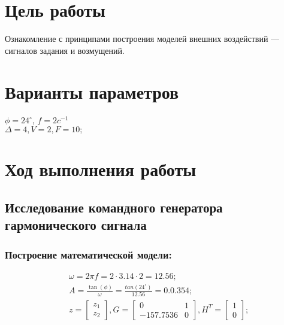 







\section{Цель работы}
Ознакомление с принципами построения моделей внешних воздействий — сигналов задания и возмущений.


\section{Варианты параметров}
$\phi = 24^\circ$, $f = 2 c^{-1}$\\
		
$\Delta=	4, V=2, F=10;$\\									
\section{Ход выполнения работы}

\subsection{Исследование командного генератора гармонического сигнала}

\subsubsection{Построение математической модели:}
\begin{equation}
	\begin{split}
&\omega=2\pi f=2\cdot 3.14\cdot 2=12.56;\\
&A=\frac{\tan(\phi)}{\omega}=\frac{tan(24^\circ)}{12.56}=0.0.354;\\
&z = \begin{bmatrix}
				z_1\\
				z_2
				\end{bmatrix}, G = \begin{bmatrix}
				0 & 1\\
				-157.7536 & 0
				\end{bmatrix}, H^T = \begin{bmatrix}
				1\\
				0
				\end{bmatrix};\\
	\end{split}				
\end{equation}
				
